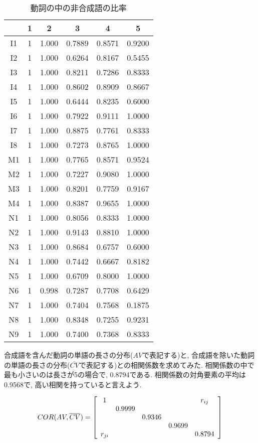 \begin{table}[htb]
\caption{{\dg 動詞の中の非合成語の比率}\label{goseigop}}
\begin{center}
\small{
\begin{tabular}{cc c c c c} \hline
   & 1 &    2     &     3    &     4    &5    \\ \hline
I1& 1& 1.000& 0.7889& 0.8571& 0.9200\\
I2& 1& 1.000& 0.6264& 0.8167& 0.5455\\
I3& 1& 1.000& 0.8211& 0.7286& 0.8333\\
I4& 1& 1.000& 0.8602& 0.8909& 0.8667\\
I5& 1& 1.000& 0.6444& 0.8235& 0.6000\\
I6& 1& 1.000& 0.7922& 0.9111& 1.0000\\
I7& 1& 1.000& 0.8875& 0.7761& 0.8333\\
I8& 1& 1.000& 0.7273& 0.8765& 1.0000\\
M1& 1& 1.000& 0.7765& 0.8571& 0.9524\\
M2& 1& 1.000& 0.7227& 0.9080& 1.0000\\
M3& 1& 1.000& 0.8201& 0.7759& 0.9167\\
M4& 1& 1.000& 0.8387& 0.9655& 1.0000\\
N1& 1& 1.000& 0.8056& 0.8333& 1.0000\\
N2& 1& 1.000& 0.9143& 0.8810& 1.0000\\
N3& 1& 1.000& 0.8684& 0.6757& 0.6000\\
N4& 1& 1.000& 0.7442& 0.6667& 0.8182\\
N5& 1& 1.000& 0.6709& 0.8000& 1.0000\\
N6& 1& 0.998& 0.7287& 0.7708& 0.6429\\
N7& 1& 1.000& 0.7404& 0.7568& 0.1875\\
N8& 1& 1.000& 0.8348& 0.7255& 0.9231\\
N9& 1& 1.000& 0.7400& 0.7368& 0.8333\\ \hline
\end{tabular}
}
\end{center}
\end{table}

合成語を含んだ動詞の単語の長さの分布($AV$で表記する)と, 合成語を除いた動詞の単語の長さの分布($\overline{CV}$で表記する)との相関係数を求めてみた. 相関係数の中で最も小さいのは長さが5の場合で, 0.8794である. 
 相関係数の対角要素の平均は0.9568で, 高い相関を持っていると言えよう. 

\[ COR(AV,\overline{CV})= \left[ \begin{array}{ccccc}
1          &          &         &          &\Large{r_{ij}}     \\
           &0.9999    &         &          &       \\
           &          & 0.9346  &          &      \\
           &          &         & 0.9699   &        \\
\Large{r_{ji}}    &          &         &          &0.8794  \\
\end{array}     \right ] \]

